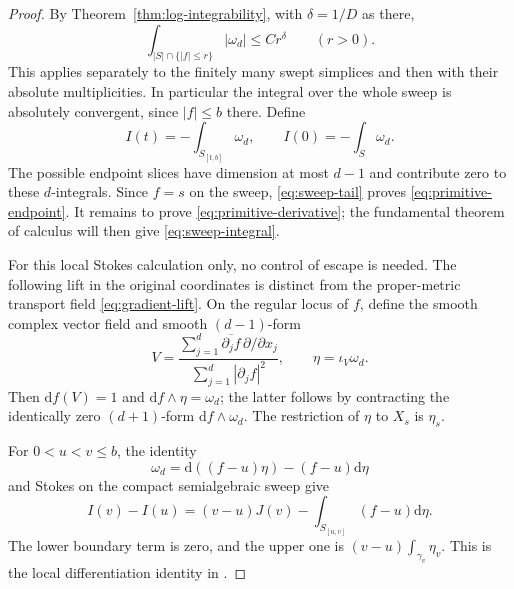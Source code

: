 \documentclass[11pt]{article}
\numberwithin{equation}{section}
\theoremstyle{definition}
\theoremstyle{remark}
\newcommand{\dd}{\mathrm d}
\newcommand{\omegaD}{\omega_d}
\begin{document}
\begin{proof}
By Theorem~\ref{thm:log-integrability}, with $\delta=1/D$ as there,
\begin{equation}\label{eq:sweep-tail}
 \int_{|S|\cap\{|f|\le r\}}|\omegaD|\le Cr^\delta
 \qquad(r>0).
\end{equation}
This applies separately to the finitely many swept simplices and then
with their absolute multiplicities. In particular the integral over the
whole sweep is absolutely convergent, since $|f|\le b$ there. Define
\[
 I(t)=-\int_{S_{[t,b]}}\omegaD,\qquad
 I(0)=-\int_S\omegaD.
\]
The possible endpoint slices have dimension at most $d-1$ and contribute
zero to these $d$-integrals. Since $f=s$ on the sweep,
\eqref{eq:sweep-tail} proves \eqref{eq:primitive-endpoint}. It remains
to prove \eqref{eq:primitive-derivative}; the fundamental theorem of
calculus will then give \eqref{eq:sweep-integral}.

For this local Stokes calculation only, no control of escape is needed.
The following lift in the original coordinates is distinct from the
proper-metric transport field \eqref{eq:gradient-lift}. On the regular
locus of $f$, define the smooth complex vector field and smooth $(d-1)$-form
\begin{equation}\label{eq:explicit-lift}
 V=\frac{\sum_{j=1}^d\overline{\partial_j f}\,\partial/\partial x_j}
          {\sum_{j=1}^d|\partial_j f|^2},
 \qquad \eta=\iota_V\omegaD.
\end{equation}
Then $\dd f(V)=1$ and $\dd f\wedge\eta=\omegaD$; the latter follows
by contracting the identically zero $(d+1)$-form $\dd f\wedge\omegaD$.
The restriction of $\eta$ to $X_s$ is $\eta_s$.

For $0<u<v\le b$, the identity
\[
 \omegaD=\dd((f-u)\eta)-(f-u)\dd\eta
\]
and Stokes on the compact semialgebraic sweep give
\begin{equation}\label{eq:stokes-primitive}
 I(v)-I(u)=(v-u)J(v)-\int_{S_{[u,v]}}(f-u)\dd\eta.
\end{equation}
The lower boundary term is zero, and the upper one is
$(v-u)\int_{\gamma_v}\eta_v$. This is the local differentiation
identity in \cite[Lemma 9]{DvK}.


\end{proof}
\end{document}
